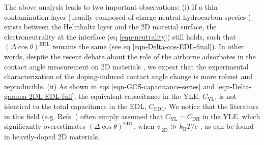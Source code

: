 \documentclass[journal=langd5,manuscript=article,email=true,hyperref=true,keywords=true]{achemso}
\begin{document}
The above analysis leads to two important observations: (i) If a thin
contamination layer (usually composed of charge-neutral hydrocarbon
species \cite{li_effect_2013}) exists between the Helmholtz layer and
the 2D material surface, the electroneutrality at the interface (eq
\ref{eqn-neutrality}) still holds, such that \((\Delta \cos
\theta)^{\mathrm{EDL}}\) remains the same (see eq
\ref{eqn-Delta-cos-EDL-final}). In other words, despite the recent
debate about the role of the airborne adsorbates in the contact angle
measurement on 2D materials
\cite{li_effect_2013,Kozbial_2015,Xu_2013_withwhat,Chow_2015}, we expect
that the experimental characterization of the doping-induced contact
angle change is more robust and reproducible. (ii) As shown in eqs
\ref{eqn-GCS-capacitance-series} and \ref{eqn-Delta-gamma-2DL-EDL-full},
the equivalent capacitance in the YLE, \(C_{\mathrm{YL}}\), is not
identical to the total capacitance in the EDL, \(C_{\mathrm{EDL}}\). We
notice that the literature in this field (e.g. Refs.
)
often simply assumed that \(C_{\mathrm{YL}}=C_{\mathrm{DH}}\) in the
YLE, which significantly overestimates \((\Delta \cos
\theta)^{\mathrm{EDL}}\), when \(\psi_{\mathrm{2D}} \gg
k_{\mathrm{B}}T/e\) \cite{israelachvili03_inter}, as can be found in heavily-doped 2D materials. 
\end{document}
